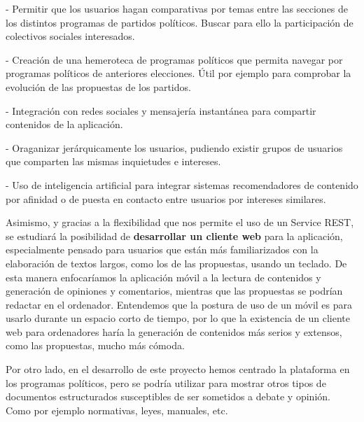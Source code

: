 - Permitir que los usuarios hagan comparativas por temas entre las secciones de los distintos programas de partidos políticos. Buscar para ello la participación de colectivos sociales interesados.  

- Creación de una hemeroteca de programas políticos que permita navegar por programas políticos de anteriores elecciones. Útil por ejemplo para comprobar la evolución de las propuestas de los partidos.

- Integración con redes sociales y mensajería instantánea para compartir contenidos de la aplicación.

- Oraganizar jerárquicamente los usuarios, pudiendo existir grupos de usuarios que comparten las mismas inquietudes e intereses.

- Uso de inteligencia artificial para integrar sistemas recomendadores de contenido por afinidad o de puesta en contacto entre usuarios por intereses similares.
 
Asimismo, y gracias a la flexibilidad que nos permite el uso de un Service REST, se estudiará la posibilidad de \textbf{desarrollar un cliente web} para la aplicación, especialmente pensado para usuarios que están más familiarizados con la elaboración de textos largos, como los de las propuestas, usando un teclado. De esta manera enfocaríamos la aplicación móvil a la lectura de contenidos y generación de opiniones y comentarios, mientras que las propuestas se podrían redactar en el ordenador. Entendemos que la postura de uso de un móvil es para usarlo durante un espacio corto de tiempo, por lo que la existencia de un cliente web para ordenadores haría la generación de contenidos más serios y extensos, como las propuestas, mucho más cómoda.

Por otro lado, en el desarrollo de este proyecto hemos centrado la plataforma en los programas políticos, pero se podría utilizar para mostrar otros tipos de documentos estructurados susceptibles de ser sometidos a debate y opinión. Como por ejemplo normativas, leyes, manuales, etc.






